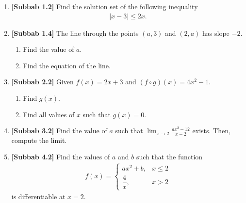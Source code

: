 \documentclass[10pt,openany,a4paper]{article}
\theoremstyle{definition}
\theoremstyle{definition}
\theoremstyle{plain}
\begin{document}
\begin{enumerate}
    \item \textbf{[Subbab 1.2]} Find the solution set of the following inequality
    \begin{align*}
        |x-3|\leq 2x.
    \end{align*}

    \item \textbf{[Subbab 1.4]} The line through the points $(a,3)$ and $(2,a)$ has slope $-2$.
    \begin{enumerate}
        \item[a.] Find the value of $a$.
        \item[b.] Find the equation of the line.
    \end{enumerate}

    \item \textbf{[Subbab 2.2]} Given $f(x)=2x+3$ and $(f\circ g)(x)=4x^2-1$.
    \begin{enumerate}
        \item[a.] Find $g(x)$.
        \item[b.] Find all values of $x$ such that $g(x)=0$.
    \end{enumerate}

    \item \textbf{[Subbab 3.2]} Find the value of $a$ such that $\displaystyle\lim_{x\to 2}\frac{ax^2-12}{x-2}$ exists. Then, compute the limit.

    \item \textbf{[Subbab 4.2]} Find the values of $a$ and $b$ such that the function
    \begin{align*}
        f(x)=\begin{cases}
            ax^2+b, & x\leq 2\\
            \dfrac{4}{x}, & x>2
        \end{cases}
    \end{align*}
    is differentiable at $x=2$.
\end{enumerate}

\newpage
\end{document}
